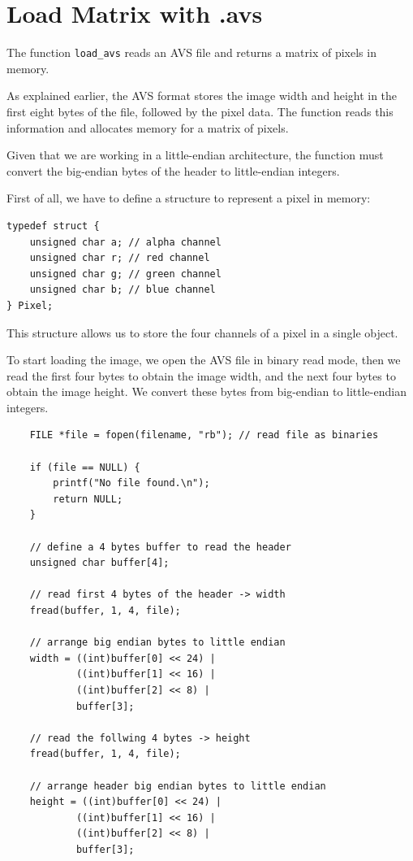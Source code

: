 \section{Load Matrix with .avs}
The function \texttt{load\_avs} reads an AVS file and returns a matrix of pixels in memory.

As explained earlier, the AVS format stores the image width and height in the first eight bytes of the file, followed by the pixel data. The function reads this information and allocates memory for a matrix of pixels.

Given that we are working in a little-endian architecture, the function must convert the big-endian bytes of the header to little-endian integers.

First of all, we have to define a structure to represent a pixel in memory:

\begin{lstlisting}
typedef struct {
    unsigned char a; // alpha channel
    unsigned char r; // red channel
    unsigned char g; // green channel
    unsigned char b; // blue channel
} Pixel;
\end{lstlisting}

This structure allows us to store the four channels of a pixel in a single object. 

To start loading the image, we open the AVS file in binary read mode, then we read the first four bytes to obtain the image width, and the next four bytes to obtain the image height. We convert these bytes from big-endian to little-endian integers.

\begin{lstlisting}
    FILE *file = fopen(filename, "rb"); // read file as binaries

    if (file == NULL) {
        printf("No file found.\n");
        return NULL;
    }

    // define a 4 bytes buffer to read the header
    unsigned char buffer[4];

    // read first 4 bytes of the header -> width
    fread(buffer, 1, 4, file);

    // arrange big endian bytes to little endian
    width = ((int)buffer[0] << 24) |
            ((int)buffer[1] << 16) |
            ((int)buffer[2] << 8) |
            buffer[3];

    // read the follwing 4 bytes -> height
    fread(buffer, 1, 4, file);

    // arrange header big endian bytes to little endian
    height = ((int)buffer[0] << 24) |
            ((int)buffer[1] << 16) |
            ((int)buffer[2] << 8) |
            buffer[3];
\end{lstlisting}

